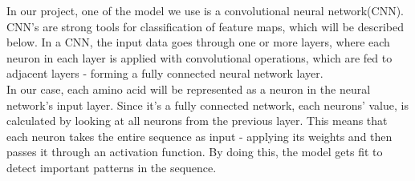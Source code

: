 In our project, one of the model we use is a convolutional neural network(CNN). CNN's are strong tools for classification of feature maps, which will be described below. In a CNN, the input data goes through one or more layers, where each neuron in each layer is applied with convolutional operations, which are fed to adjacent layers - forming a fully connected neural network layer. \\

\noindent
In our case, each amino acid will be represented as a neuron in the neural network's input layer. Since it's a fully connected network, each neurons' value, is calculated by looking at all neurons from the previous layer. This means that each neuron takes the entire sequence as input - applying its weights and then passes it through an activation function. By doing this, the model gets fit to detect important patterns in the sequence.

